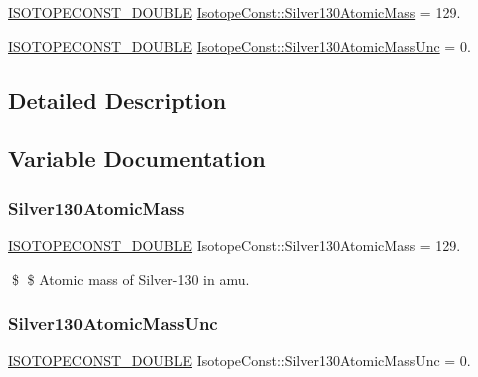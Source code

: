 \begin{DoxyCompactItemize}
\item 
\mbox{\hyperlink{group___isotope_const-_macros_ga8f45a7272ce02c0b4c65c44636ed719a}{I\+S\+O\+T\+O\+P\+E\+C\+O\+N\+S\+T\+\_\+\+D\+O\+U\+B\+LE}} \mbox{\hyperlink{group___isotope_const-_silver-_ag130_gafcd20493ebd1f391d8beb78408d84c41}{Isotope\+Const\+::\+Silver130\+Atomic\+Mass}} = 129.
\item 
\mbox{\hyperlink{group___isotope_const-_macros_ga8f45a7272ce02c0b4c65c44636ed719a}{I\+S\+O\+T\+O\+P\+E\+C\+O\+N\+S\+T\+\_\+\+D\+O\+U\+B\+LE}} \mbox{\hyperlink{group___isotope_const-_silver-_ag130_gacf933609625a4dba8a717cf2c3a4ff10}{Isotope\+Const\+::\+Silver130\+Atomic\+Mass\+Unc}} = 0.
\end{DoxyCompactItemize}


\subsection{Detailed Description}


\subsection{Variable Documentation}
\mbox{\label{group___isotope_const-_silver-_ag130_gafcd20493ebd1f391d8beb78408d84c41}} 
\subsubsection{\texorpdfstring{Silver130\+Atomic\+Mass}{Silver130AtomicMass}}
{\footnotesize\ttfamily \mbox{\hyperlink{group___isotope_const-_macros_ga8f45a7272ce02c0b4c65c44636ed719a}{I\+S\+O\+T\+O\+P\+E\+C\+O\+N\+S\+T\+\_\+\+D\+O\+U\+B\+LE}} Isotope\+Const\+::\+Silver130\+Atomic\+Mass = 129.}

\$ \$ Atomic mass of Silver-\/130 in amu. \mbox{\label{group___isotope_const-_silver-_ag130_gacf933609625a4dba8a717cf2c3a4ff10}} 
\subsubsection{\texorpdfstring{Silver130\+Atomic\+Mass\+Unc}{Silver130AtomicMassUnc}}
{\footnotesize\ttfamily \mbox{\hyperlink{group___isotope_const-_macros_ga8f45a7272ce02c0b4c65c44636ed719a}{I\+S\+O\+T\+O\+P\+E\+C\+O\+N\+S\+T\+\_\+\+D\+O\+U\+B\+LE}} Isotope\+Const\+::\+Silver130\+Atomic\+Mass\+Unc = 0.}

